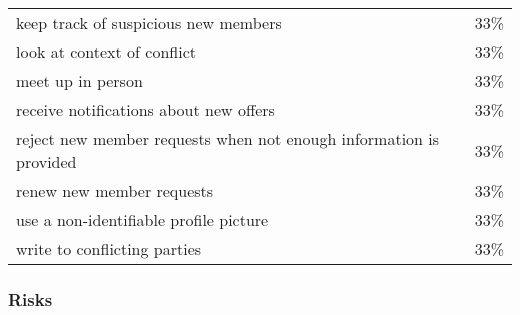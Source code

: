 \begin{longtable}{p{}r}
keep track of suspicious new members                                & 33\%                        \\
look at context of conflict                                         & 33\%                        \\
meet up in person                                                   & 33\%                        \\
receive notifications about new offers                              & 33\%                        \\
reject new member requests when not enough information is provided  & 33\%                        \\
renew new member requests                                           & 33\%                        \\
use a non-identifiable profile picture                              & 33\%                        \\
write to conflicting parties                                        & 33\%
\end{longtable}

\subsubsection*{Risks}

